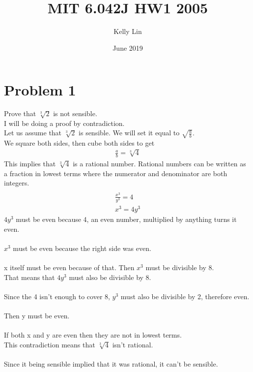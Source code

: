 \documentclass{article}
\title{MIT 6.042J HW1 2005}
\author{Kelly Lin }
\date{June 2019}
\begin{document}
\maketitle

\section{Problem 1}

Prove that $\sqrt[3]{2}$ is not sensible. 
\\
I will be doing a proof by contradiction. 
\\
Let us assume that $\sqrt[3]{2}$ is sensible. We will set it equal to $\sqrt{\frac{a}{b}}$.
\\
We square both sides, then cube both sides to get
\begin {align*}
\frac{a}{b} = \sqrt[3]{4}
\end {align*}
This implies that $\sqrt[3]{4}$ is a rational number. Rational numbers can be written as a fraction in lowest terms where the numerator and denominator are both integers. 
\begin {align*}
\\
\frac{x^{3}}{y^{3}} = 4
\\
x^{3} = 4y^{3}
\end {align*}
$4y^{3}$ must be even because 4, an even number, multiplied by anything turns it even.
\\\\
$x^{3}$ must be even because the right side was even. 
\\\\
x itself must be even because of that. Then $x^{3}$ must be divisible by 8. 
\\
That means that $4y^{3}$ must also be divisible by 8. 
\\\\
Since the 4 isn't enough to cover 8, $y^{3}$ must also be divisible by 2, therefore even. 
\\\\
Then y must be even. 
\\ \\
If both x and y are even then they are not in lowest terms. 
\\
This contradiction means that $\sqrt[3]{4}$ isn't rational. 
\\\\
Since it being sensible implied that it was rational, it can't be sensible. 

\\
\end{document}
